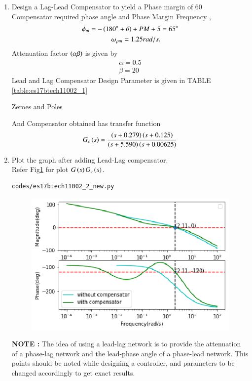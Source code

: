 \begin{enumerate}[label=\thesection.\arabic*.,ref=\thesection.\theenumi]
\item Design a Lag-Lead Compensator to yield a Phase margin of 60\degree \\
\solution Compensator required phase angle  and  Phase Margin Frequency , 
\begin{align}
    \phi_{m}= -\left(180\degree+\theta\right)+PM+5 & =65\degree
    \\
    \omega_{pm}=1.25 rad/s.
\end{align}
Attenuation factor $\left(\alpha\beta\right)$ is given by
\begin{align}
\alpha= 0.5
\\
\beta =  20
\end{align}
Lead and Lag Compensator Design Parameter is given in TABLE \ref{table:es17btech11002_1}
\begin{table}[!ht]
\centering

\caption{Zeroes and Poles}
\label{table:es17btech11002_1}
\end{table}
And Compensator obtained has transfer function
\begin{align}
    G_{c}\left(s\right)= \frac{\left(s+0.279\right)\left(s+0.125\right)}{\left(s+5.590\right)\left(s+0.00625\right)}
\end{align}

\item Plot the graph after adding Lead-Lag compensator.
\\
\solution Refer Fig\ref{fig:es17btech11002_2} for plot $G\left(s\right)G_{c}\left(s\right)$.
\begin{lstlisting}
codes/es17btech11002_2_new.py
\end{lstlisting}
\begin{figure}[!h]
\centering
\includegraphics[width=\columnwidth]{./figs/es17btech11002_2_new.eps}
\caption{}
\label{fig:es17btech11002_2}
\end{figure}

\textbf{NOTE :} The idea of using a lead-lag network is to provide the attenuation of a phase-lag network and the lead-phase angle of a phase-lead
network. This points should be noted while designing a controller, and parameters to be changed accordingly to get exact results.
\end{enumerate}     
